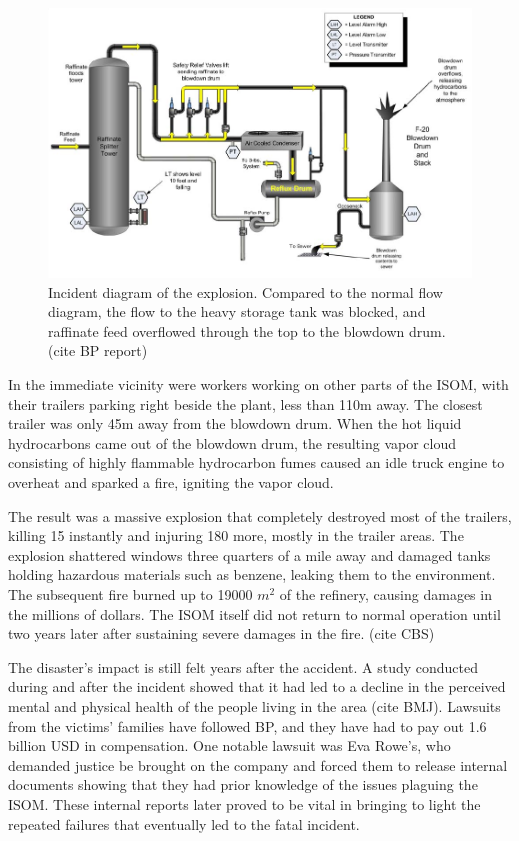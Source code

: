 \documentclass[12pt]{article}
\begin{document}
	\begin{figure}[H]

		\includegraphics[width=\textwidth]{BP_Texas_City_incident_diagram.png}
		\caption{Incident diagram of the explosion. Compared to the normal flow diagram, the flow to the heavy storage tank was blocked, and raffinate feed overflowed through the top to the blowdown drum. (cite BP report)}
		\label{fig:incidentdiagram}
	\end{figure}
	In the immediate vicinity were workers working on other parts of the ISOM, with their trailers parking right beside the plant, less than 110m away. The closest trailer was only 45m away from the blowdown drum. When the hot liquid hydrocarbons came out of the blowdown drum, the resulting vapor cloud consisting of highly flammable hydrocarbon fumes caused an idle truck engine to overheat and sparked a fire, igniting the vapor cloud. 
	
	The result was a massive explosion that completely destroyed most of the trailers, killing 15 instantly and injuring 180 more, mostly in the trailer areas. The explosion shattered windows three quarters of a mile away and damaged tanks holding hazardous materials such as benzene, leaking them to the environment. The subsequent fire burned up to 19000 $m^2$ of the refinery, causing damages in the millions of dollars. The ISOM itself did not return to normal operation until two years later after sustaining severe damages in the fire. (cite CBS)
	
	The disaster's impact is still felt years after the accident. A study conducted during and after the incident showed that it had led to a decline in the perceived mental and physical health of the people living in the area (cite BMJ). Lawsuits from the victims' families have followed BP, and they have had to pay out 1.6 billion USD in compensation. One notable lawsuit was Eva Rowe's, who demanded justice be brought on the company and forced them to release internal documents showing that they had prior knowledge of the issues plaguing the ISOM. These internal reports later proved to be vital in bringing to light the repeated failures that eventually led to the fatal incident.
\end{document}
